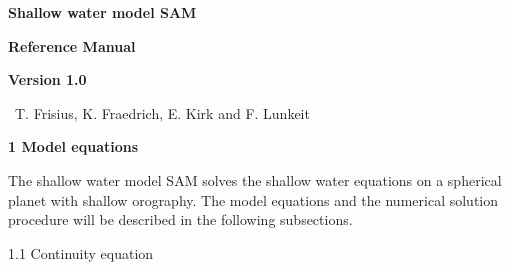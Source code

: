 \setlength{\unitlength}{1cm}
\setlength{\textwidth}{6.0in}
\setlength{\textheight}{9.6in}
\setlength{\topmargin}{-0.5in}
\setlength{\oddsidemargin}{0.25in}
\setlength{\intextsep}{0.0in}
\renewcommand{\baselinestretch}{1} 
\renewcommand{\topfraction}{.9} 
\renewcommand{\bottomfraction}{.9} 
\renewcommand{\textfraction}{.05} 
\renewcommand{\floatpagefraction}{.5} 
\setlength{\parskip}{\bigskipamount}
\setlength{\parindent}{0em} 
\setcounter{topnumber}{2} 
\setcounter{bottomnumber}{2} 
\renewcommand{\theequation}{%
              \mbox{\arabic{num}.\arabic{equation}\alph{alpheqn}}}%
  
{\pagestyle{empty}
\begin{center}

{\LARGE \bf Shallow water model SAM}

\vspace{1.in}

{\LARGE \bf Reference Manual}

\vspace{1.in}

{\LARGE \bf Version 1.0}

\vspace{1.in}

{\large ~T. Frisius, K. Fraedrich, E. Kirk and F. Lunkeit}



\end{center}


\newpage
}
\setcounter{page}{1}
\setcounter{num}{1}
\setcounter{alpheqn}{0}
\setcounter{equation}{0}

{\bf 1 Model equations}

The shallow water model SAM solves the shallow water equations on a
spherical planet with shallow orography. The model equations and the
numerical solution procedure will be described in the following subsections.

1.1 Continuity equation

\nopagebreak[4]

